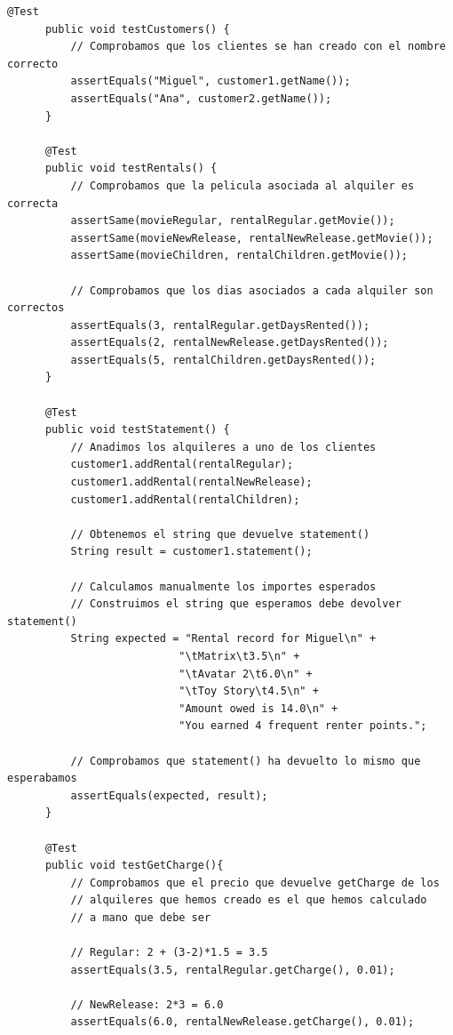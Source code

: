 \begin{lstlisting}[caption={RentalTest.java}]
      @Test
      public void testCustomers() {
          // Comprobamos que los clientes se han creado con el nombre correcto
          assertEquals("Miguel", customer1.getName());
          assertEquals("Ana", customer2.getName());
      }
      
      @Test
      public void testRentals() {
          // Comprobamos que la pelicula asociada al alquiler es correcta
          assertSame(movieRegular, rentalRegular.getMovie());
          assertSame(movieNewRelease, rentalNewRelease.getMovie());
          assertSame(movieChildren, rentalChildren.getMovie());
          
          // Comprobamos que los dias asociados a cada alquiler son correctos
          assertEquals(3, rentalRegular.getDaysRented());
          assertEquals(2, rentalNewRelease.getDaysRented());
          assertEquals(5, rentalChildren.getDaysRented());
      }
      
      @Test
      public void testStatement() {
          // Anadimos los alquileres a uno de los clientes
          customer1.addRental(rentalRegular);
          customer1.addRental(rentalNewRelease);
          customer1.addRental(rentalChildren);
          
          // Obtenemos el string que devuelve statement()
          String result = customer1.statement();
          
          // Calculamos manualmente los importes esperados
          // Construimos el string que esperamos debe devolver statement()
          String expected = "Rental record for Miguel\n" +
                           "\tMatrix\t3.5\n" +
                           "\tAvatar 2\t6.0\n" +
                           "\tToy Story\t4.5\n" +
                           "Amount owed is 14.0\n" +
                           "You earned 4 frequent renter points.";
          
          // Comprobamos que statement() ha devuelto lo mismo que esperabamos
          assertEquals(expected, result);
      }
   
      @Test
      public void testGetCharge(){
          // Comprobamos que el precio que devuelve getCharge de los
          // alquileres que hemos creado es el que hemos calculado
          // a mano que debe ser
          
          // Regular: 2 + (3-2)*1.5 = 3.5
          assertEquals(3.5, rentalRegular.getCharge(), 0.01);
          
          // NewRelease: 2*3 = 6.0
          assertEquals(6.0, rentalNewRelease.getCharge(), 0.01);
          

\end{lstlisting}
